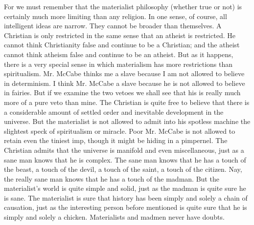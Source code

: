 \documentclass{book}
\begin{document}
For we must remember that the materialist philosophy (whether true or not) is certainly much more limiting than any religion. In one sense, of course, all intelligent ideas are narrow. They cannot be broader than themselves. A Christian is only restricted in the same sense that an atheist is restricted. He cannot think Christianity false and continue to be a Christian; and the atheist cannot think atheism false and continue to be an atheist. But as it happens, there is a very special sense in which materialism has more restrictions than spiritualism. Mr. McCabe thinks me a slave because I am not allowed to believe in determinism. I think Mr. McCabe a slave because he is not allowed to believe in fairies. But if we examine the two vetoes we shall see that his is really much more of a pure veto than mine. The Christian is quite free to believe that there is a considerable amount of settled order and inevitable development in the universe. But the materialist is not allowed to admit into his spotless machine the slightest speck of spiritualism or miracle. Poor Mr. McCabe is not allowed to retain even the tiniest imp, though it might be hiding in a pimpernel. The Christian admits that the universe is manifold and even miscellaneous, just as a sane man knows that he is complex. The sane man knows that he has a touch of the beast, a touch of the devil, a touch of the saint, a touch of the citizen. Nay, the really sane man knows that he has a touch of the madman. But the materialist’s world is quite simple and solid, just as the madman is quite sure he is sane. The materialist is sure that history has been simply and solely a chain of causation, just as the interesting person before mentioned is quite sure that he is simply and solely a chicken. Materialists and madmen never have doubts.
\end{document}

